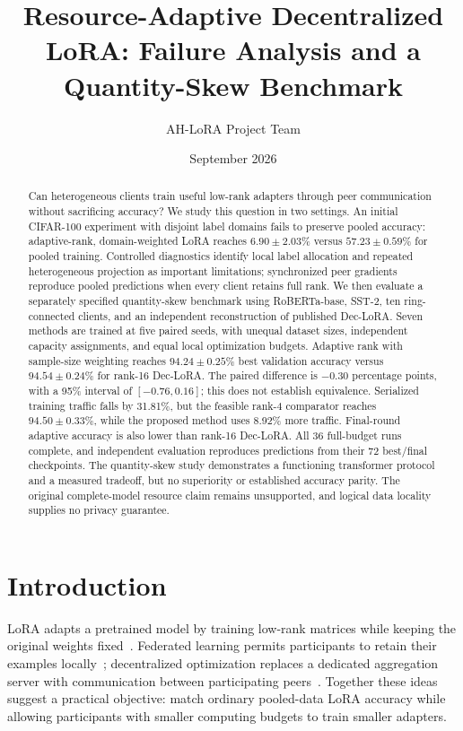 \documentclass[11pt]{article}
\title{Resource-Adaptive Decentralized LoRA: Failure Analysis and a Quantity-Skew Benchmark}
\author{AH-LoRA Project Team}
\date{September 2026}
\begin{document}
\maketitle
\begin{abstract}
Can heterogeneous clients train useful low-rank adapters through peer communication without sacrificing accuracy? We study this question in two settings. An initial CIFAR-100 experiment with disjoint label domains fails to preserve pooled accuracy: adaptive-rank, domain-weighted LoRA reaches $6.90\pm2.03\%$ versus $57.23\pm0.59\%$ for pooled training. Controlled diagnostics identify local label allocation and repeated heterogeneous projection as important limitations; synchronized peer gradients reproduce pooled predictions when every client retains full rank. We then evaluate a separately specified quantity-skew benchmark using RoBERTa-base, SST-2, ten ring-connected clients, and an independent reconstruction of published Dec-LoRA. Seven methods are trained at five paired seeds, with unequal dataset sizes, independent capacity assignments, and equal local optimization budgets. Adaptive rank with sample-size weighting reaches $94.24\pm0.25\%$ best validation accuracy versus $94.54\pm0.24\%$ for rank-16 Dec-LoRA. The paired difference is $-0.30$ percentage points, with a 95\% interval of $[-0.76,0.16]$; this does not establish equivalence. Serialized training traffic falls by 31.81\%, but the feasible rank-4 comparator reaches $94.50\pm0.33\%$, while the proposed method uses 8.92\% more traffic. Final-round adaptive accuracy is also lower than rank-16 Dec-LoRA. All 36 full-budget runs complete, and independent evaluation reproduces predictions from their 72 best/final checkpoints. The quantity-skew study demonstrates a functioning transformer protocol and a measured tradeoff, but no superiority or established accuracy parity. The original complete-model resource claim remains unsupported, and logical data locality supplies no privacy guarantee.
\end{abstract}

\section{Introduction}
LoRA adapts a pretrained model by training low-rank matrices while keeping the original weights fixed~\citep{hu2022lora}. Federated learning permits participants to retain their examples locally~\citep{mcmahan2017fedavg}; decentralized optimization replaces a dedicated aggregation server with communication between participating peers~\citep{boyd2006gossip,lian2017dpsgd}. Together these ideas suggest a practical objective: match ordinary pooled-data LoRA accuracy while allowing participants with smaller computing budgets to train smaller adapters.
\end{document}
